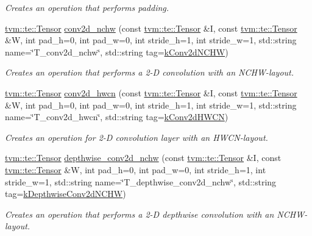 \begin{DoxyCompactItemize}
\begin{DoxyCompactList}\small\item\em Creates an operation that performs padding. \end{DoxyCompactList}\item 
\hyperlink{classtvm_1_1te_1_1Tensor}{tvm\+::te\+::\+Tensor} \hyperlink{namespacetopi_a8a735444c0de6d147a021755033b64dd}{conv2d\+\_\+nchw} (const \hyperlink{classtvm_1_1te_1_1Tensor}{tvm\+::te\+::\+Tensor} \&I, const \hyperlink{classtvm_1_1te_1_1Tensor}{tvm\+::te\+::\+Tensor} \&W, int pad\+\_\+h=0, int pad\+\_\+w=0, int stride\+\_\+h=1, int stride\+\_\+w=1, std\+::string name=\char`\"{}T\+\_\+conv2d\+\_\+nchw\char`\"{}, std\+::string tag=\hyperlink{namespacetopi_a8e842c3723b0ad6b2fb82ecb98b8a1c2}{k\+Conv2d\+N\+C\+HW})
\begin{DoxyCompactList}\small\item\em Creates an operation that performs a 2-\/D convolution with an N\+C\+H\+W-\/layout. \end{DoxyCompactList}\item 
\hyperlink{classtvm_1_1te_1_1Tensor}{tvm\+::te\+::\+Tensor} \hyperlink{namespacetopi_a727438671ef6d05e50edb4b01d556da8}{conv2d\+\_\+hwcn} (const \hyperlink{classtvm_1_1te_1_1Tensor}{tvm\+::te\+::\+Tensor} \&I, const \hyperlink{classtvm_1_1te_1_1Tensor}{tvm\+::te\+::\+Tensor} \&W, int pad\+\_\+h=0, int pad\+\_\+w=0, int stride\+\_\+h=1, int stride\+\_\+w=1, std\+::string name=\char`\"{}T\+\_\+conv2d\+\_\+hwcn\char`\"{}, std\+::string tag=\hyperlink{namespacetopi_a0a63c3748ea82acd5eef2b608c83e165}{k\+Conv2d\+H\+W\+CN})
\begin{DoxyCompactList}\small\item\em Creates an operation for 2-\/D convolution layer with an H\+W\+C\+N-\/layout. \end{DoxyCompactList}\item 
\hyperlink{classtvm_1_1te_1_1Tensor}{tvm\+::te\+::\+Tensor} \hyperlink{namespacetopi_a8f9fd494ac9bbb4d174d758b447037d3}{depthwise\+\_\+conv2d\+\_\+nchw} (const \hyperlink{classtvm_1_1te_1_1Tensor}{tvm\+::te\+::\+Tensor} \&I, const \hyperlink{classtvm_1_1te_1_1Tensor}{tvm\+::te\+::\+Tensor} \&W, int pad\+\_\+h=0, int pad\+\_\+w=0, int stride\+\_\+h=1, int stride\+\_\+w=1, std\+::string name=\char`\"{}T\+\_\+depthwise\+\_\+conv2d\+\_\+nchw\char`\"{}, std\+::string tag=\hyperlink{namespacetopi_a12dcb067885b89c536ae094569e8e3fb}{k\+Depthwise\+Conv2d\+N\+C\+HW})
\begin{DoxyCompactList}\small\item\em Creates an operation that performs a 2-\/D depthwise convolution with an N\+C\+H\+W-\/layout. \end{DoxyCompactList}\item 

\end{DoxyCompactItemize}
